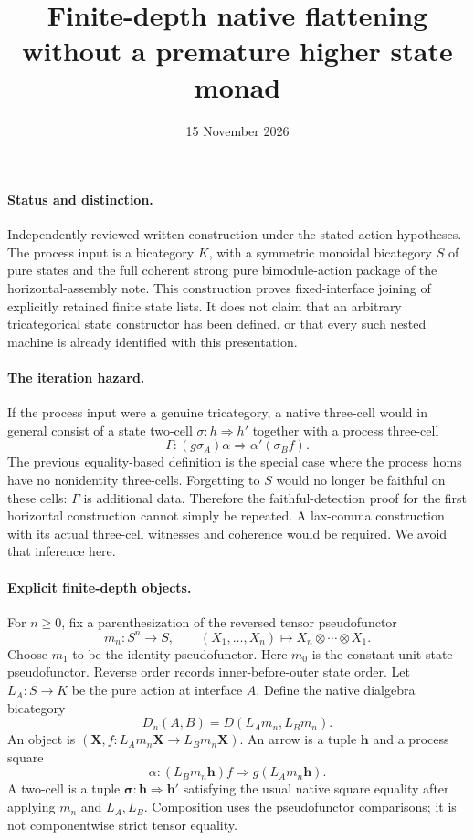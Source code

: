 \documentclass{article}
\title{Finite-depth native flattening without a premature higher state monad}
\date{15 November 2026}
\begin{document}
\maketitle
\paragraph{Status and distinction.} Independently reviewed written construction under the stated action hypotheses. The process input is a bicategory $K$, with a symmetric monoidal bicategory $S$ of pure states and the full coherent strong pure bimodule-action package of the horizontal-assembly note. This construction proves fixed-interface joining of explicitly retained finite state lists. It does not claim that an arbitrary tricategorical state constructor has been defined, or that every such nested machine is already identified with this presentation.

\paragraph{The iteration hazard.} If the process input were a genuine tricategory, a native three-cell would in general consist of a state two-cell $\sigma:h\Rightarrow h'$ together with a process three-cell
\[
\Gamma:(g\sigma_A)\alpha\Longrightarrow\alpha'(\sigma_B f).
\]
The previous equality-based definition is the special case where the process homs have no nonidentity three-cells. Forgetting to $S$ would no longer be faithful on these cells: $\Gamma$ is additional data. Therefore the faithful-detection proof for the first horizontal construction cannot simply be repeated. A lax-comma construction with its actual three-cell witnesses and coherence would be required. We avoid that inference here.

\paragraph{Explicit finite-depth objects.} For $n\geq 0$, fix a parenthesization of the reversed tensor pseudofunctor
\[
 m_n:S^n\longrightarrow S,\qquad
 (X_1,\ldots,X_n)\longmapsto X_n\otimes\cdots\otimes X_1.
\]
Choose $m_1$ to be the identity pseudofunctor. Here $m_0$ is the constant unit-state pseudofunctor. Reverse order records inner-before-outer state order. Let $L_A:S\to K$ be the pure action at interface $A$. Define the native dialgebra bicategory
\[
 D_n(A,B)=D(L_A m_n,L_B m_n).
\]
An object is $(\mathbf X,f:L_A m_n\mathbf X\to L_B m_n\mathbf X)$. An arrow is a tuple $\mathbf h$ and a process square
\[
 \alpha:(L_Bm_n\mathbf h)f\Rightarrow g(L_Am_n\mathbf h).
\]
A two-cell is a tuple $\boldsymbol\sigma:\mathbf h\Rightarrow\mathbf h'$ satisfying the usual native square equality after applying $m_n$ and $L_A,L_B$. Composition uses the pseudofunctor comparisons; it is not componentwise strict tensor equality.
\end{document}
